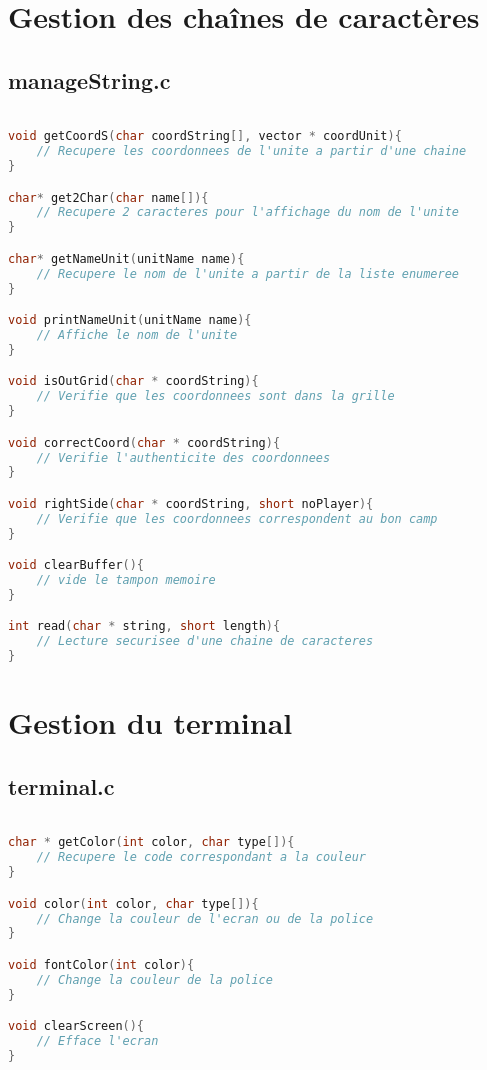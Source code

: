 \documentclass[a4paper,10pt]{extreport}
\begin{document}
\part{Gestion des chaînes de caractères}

\chapter{manageString.c}
\vspace{-1cm}

\begin{lstlisting}[language=c]

void getCoordS(char coordString[], vector * coordUnit){
	// Recupere les coordonnees de l'unite a partir d'une chaine
}

char* get2Char(char name[]){
	// Recupere 2 caracteres pour l'affichage du nom de l'unite
}

char* getNameUnit(unitName name){
	// Recupere le nom de l'unite a partir de la liste enumeree
}

void printNameUnit(unitName name){
	// Affiche le nom de l'unite 
}

void isOutGrid(char * coordString){
	// Verifie que les coordonnees sont dans la grille
}

void correctCoord(char * coordString){
	// Verifie l'authenticite des coordonnees
}

void rightSide(char * coordString, short noPlayer){
	// Verifie que les coordonnees correspondent au bon camp
}

void clearBuffer(){
	// vide le tampon memoire
}

int read(char * string, short length){
	// Lecture securisee d'une chaine de caracteres
}

\end{lstlisting}

\part{Gestion du terminal}

\chapter{terminal.c}
\vspace{-1cm}

\begin{lstlisting}[language=c]

char * getColor(int color, char type[]){
	// Recupere le code correspondant a la couleur
}

void color(int color, char type[]){
	// Change la couleur de l'ecran ou de la police
}

void fontColor(int color){
	// Change la couleur de la police
}

void clearScreen(){
	// Efface l'ecran
}

\end{lstlisting}
\end{document}

